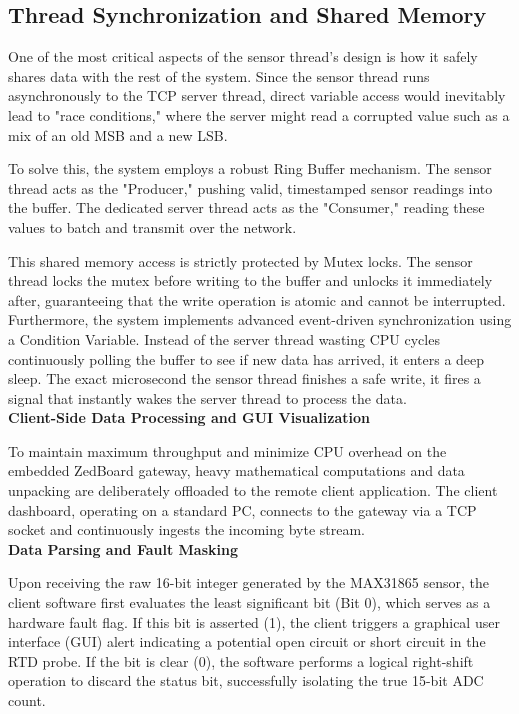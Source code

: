 \subsection{Thread Synchronization and Shared Memory}
One of the most critical aspects of the sensor thread's design is how it safely shares data with the rest of the system. Since the sensor thread runs asynchronously to the TCP server thread, direct variable access would inevitably lead to "race conditions," where the server might read a corrupted value such as a mix of an old MSB and a new LSB.

To solve this, the system employs a robust Ring Buffer mechanism. The sensor thread acts as the "Producer," pushing valid, timestamped sensor readings into the buffer. The dedicated server thread acts as the "Consumer," reading these values to batch and transmit over the network.

This shared memory access is strictly protected by Mutex locks. The sensor thread locks the mutex before writing to the buffer and unlocks it immediately after, guaranteeing that the write operation is atomic and cannot be interrupted. Furthermore, the system implements advanced event-driven synchronization using a Condition Variable. Instead of the server thread wasting CPU cycles continuously polling the buffer to see if new data has arrived, it enters a deep sleep. The exact microsecond the sensor thread finishes a safe write, it fires a signal that instantly wakes the server thread to process the data.\\

\textbf{Client-Side Data Processing and GUI Visualization}

To maintain maximum throughput and minimize CPU overhead on the embedded
ZedBoard gateway, heavy mathematical computations and data unpacking are
deliberately offloaded to the remote client application. The client dashboard,
operating on a standard PC, connects to the gateway via a TCP socket and
continuously ingests the incoming byte stream.\\

\textbf{Data Parsing and Fault Masking}

Upon receiving the raw 16-bit integer generated by the MAX31865 sensor, the
client software first evaluates the least significant bit (Bit 0), which
serves as a hardware fault flag. If this bit is asserted (1), the client
triggers a graphical user interface (GUI) alert indicating a potential open
circuit or short circuit in the RTD probe. If the bit is clear (0), the
software performs a logical right-shift operation to discard the status bit,
successfully isolating the true 15-bit ADC count.\\

